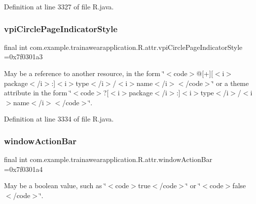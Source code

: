 Definition at line 3327 of file R.\+java.

\mbox{\label{classcom_1_1example_1_1trainawearapplication_1_1_r_1_1attr_abac146ef8b937bcdc13f11bc643c307e}} 
\subsubsection{\texorpdfstring{vpiCirclePageIndicatorStyle}{vpiCirclePageIndicatorStyle}}
{\footnotesize\ttfamily final int com.\+example.\+trainawearapplication.\+R.\+attr.\+vpi\+Circle\+Page\+Indicator\+Style =0x7f0301a3\hspace{0.3cm}{\ttfamily [static]}}

May be a reference to another resource, in the form \char`\"{}$<$code$>$@\mbox{[}+\mbox{]}\mbox{[}$<$i$>$package$<$/i$>$\+:\mbox{]}$<$i$>$type$<$/i$>$/$<$i$>$name$<$/i$>$$<$/code$>$\char`\"{} or a theme attribute in the form \char`\"{}$<$code$>$?\mbox{[}$<$i$>$package$<$/i$>$\+:\mbox{]}$<$i$>$type$<$/i$>$/$<$i$>$name$<$/i$>$$<$/code$>$\char`\"{}. 

Definition at line 3334 of file R.\+java.

\mbox{\label{classcom_1_1example_1_1trainawearapplication_1_1_r_1_1attr_a9cf36998626969e21a821ad9fcd1e695}} 
\subsubsection{\texorpdfstring{windowActionBar}{windowActionBar}}
{\footnotesize\ttfamily final int com.\+example.\+trainawearapplication.\+R.\+attr.\+window\+Action\+Bar =0x7f0301a4\hspace{0.3cm}{\ttfamily [static]}}

May be a boolean value, such as \char`\"{}$<$code$>$true$<$/code$>$\char`\"{} or \char`\"{}$<$code$>$false$<$/code$>$\char`\"{}. 

